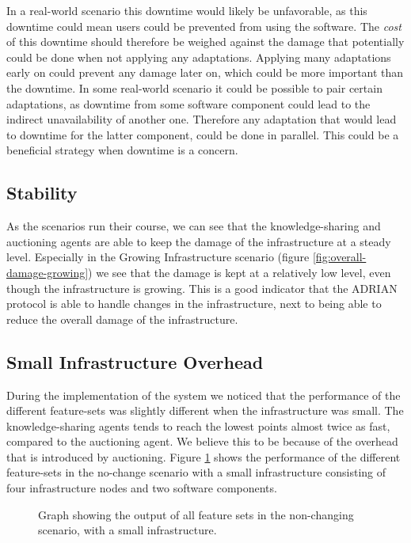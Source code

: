 In a real-world scenario this downtime would likely be unfavorable, as this downtime could mean users could be prevented from using the software. The \emph{cost} of this downtime should therefore be weighed against the damage that potentially could be done when not applying any adaptations. Applying many adaptations early on could prevent any damage later on, which could be more important than the downtime. 
In some real-world scenario it could be possible to pair certain adaptations, as downtime from some software component could lead to the indirect unavailability of another one. Therefore any adaptation that would lead to downtime for the latter component, could be done in parallel. This could be a beneficial strategy when downtime is a concern.

\subsection{Stability}
\label{ssec:stability}
As the scenarios run their course, we can see that the knowledge-sharing and auctioning agents are able to keep the damage of the infrastructure at a steady level. Especially in the Growing Infrastructure scenario (figure \ref{fig:overall-damage-growing}) we see that the damage is kept at a relatively low level, even though the infrastructure is growing. This is a good indicator that the ADRIAN protocol is able to handle changes in the infrastructure, next to being able to reduce the overall damage of the infrastructure.

\subsection{Small Infrastructure Overhead}
During the implementation of the system we noticed that the performance of the different feature-sets was slightly different when the infrastructure was small. The knowledge-sharing agents tends to reach the lowest points almost twice as fast, compared to the auctioning agent. We believe this to be because of the overhead that is introduced by auctioning. Figure \ref{fig:small-infra-no-change} shows the performance of the different feature-sets in the no-change scenario with a small infrastructure consisting of four infrastructure nodes and two software components.

\begin{figure}[H]
    \centering
        
    \caption{Graph showing the output of all feature sets in the non-changing scenario, with a small infrastructure.}
    \label{fig:small-infra-no-change}
\end{figure}

